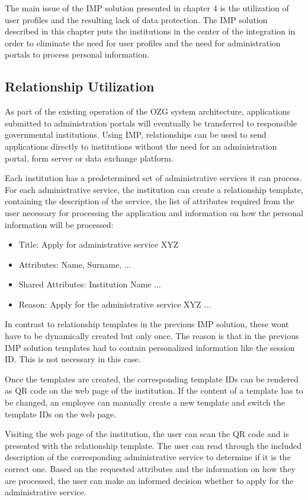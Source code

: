The main issue of the IMP solution presented in chapter 4 is the utilization of user profiles and the resulting lack of data protection. The IMP solution described in this chapter puts the institutions in the center of the integration in order to eliminate the need for user profiles and the need for administration portals to process personal information.

\subsection{Relationship Utilization}

As part of the existing operation of the OZG system architecture, applications submitted to administration portals will eventually be transferred to responsible governmental institutions. Using IMP, relationships can be used to send applications directly to institutions without the need for an administration portal, form server or data exchange platform.

Each institution has a predetermined set of administrative services it can process. For each administrative service, the institution can create a relationship template, containing the description of the service, the list of attributes required from the user necessary for processing the application and information on how the personal information will be processed:

\begin{itemize}
    \item Title: Apply for administrative service XYZ
    \item Attributes: Name, Surname, ... 
    \item Shared Attributes: Institution Name ...
    \item Reason: Apply for the administrative service XYZ ...
\end{itemize}

In contrast to relationship templates in the previous IMP solution, these wont have to be dynamically created but only once. The reason is that in the previous IMP solution templates had to contain personalized information like the session ID. This is not necessary in this case.

Once the templates are created, the corresponding template IDs can be rendered as QR code on the web page of the institution. If the content of a template has to be changed, an employee can manually create a new template and switch the template IDs on the web page.

Visiting the web page of the institution, the user can scan the QR code and is presented with the relationship template. The user can read through the included description of the corresponding administrative service to determine if it is the correct one. Based on the requested attributes and the information on how they are processed, the user can make an informed decision whether to apply for the administrative service.


